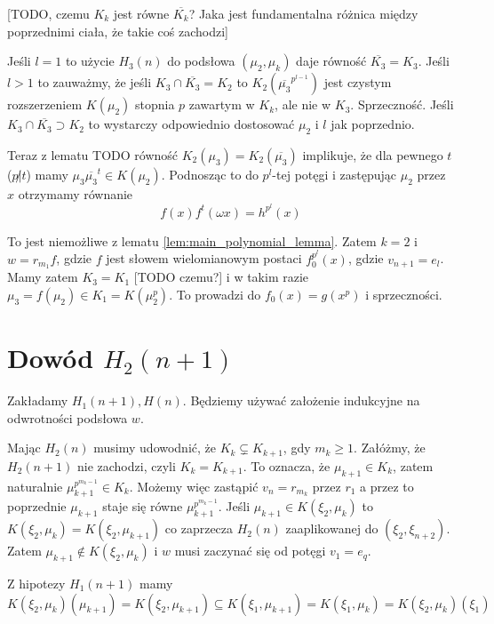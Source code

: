 [TODO, czemu $K_k$ jest równe $\overline{K_k}$? Jaka jest fundamentalna różnica
między poprzednimi ciała, że takie coś zachodzi]

Jeśli $l = 1$ to użycie $H_3(n)$ do podsłowa $\left(\mu_2, \mu_k\right)$ daje
równość $\overline{K_3} = K_3$. Jeśli $l > 1$ to zauważmy, że jeśli $K_3 \cap
\overline{K_3} = K_2$ to $K_2\left(\overline{\mu_3}^{p^{l-1}}\right)$ jest
czystym rozszerzeniem $K\left(\mu_2\right)$ stopnia $p$ zawartym w $K_k$, ale
nie w $K_3$. Sprzeczność. Jeśli $K_3 \cap \overline{K_3} \supset K_2$ to
wystarczy odpowiednio dostosować $\mu_2$ i $l$ jak poprzednio.

Teraz z lematu TODO równość $K_2\left(\mu_3\right) =
K_2\left(\overline{\mu_3}\right)$ implikuje, że dla pewnego $t$ ($p \not | t$)
mamy $\mu_3\overline{\mu_3}^t \in K\left(\mu_2\right)$. Podnosząc to do
$p^l$-tej potęgi i zastępując $\mu_2$ przez $x$ otrzymamy równanie
\[ f(x)f^t(\omega x) = h^{p^l}(x)\]

To jest niemożliwe z lematu \ref{lem:main_polynomial_lemma}. Zatem $k = 2$ i $w
= r_{m_1}f$, gdzie $f$ jest słowem wielomianowym postaci $f_0^{p^l}(x)$, gdzie
$v_{n+1} = e_l$. Mamy zatem $K_3 = K_1$ [TODO czemu?] i  w takim razie $\mu_3 =
f\left(\mu_2\right) \in K_1 = K\left(\mu_2^p\right)$. To prowadzi do $f_0(x) =
g\left(x^p\right)$ i sprzeczności.

\section{Dowód $H_2(n+1)$}
Zakładamy $H_1(n+1), H(n)$. Będziemy używać założenie indukcyjne na odwrotności
podsłowa $w$.

Mając $H_2(n)$ musimy udowodnić, że $K_k \subsetneq K_{k+1}$, gdy $m_k \geq 1$.
Załóżmy, że $H_2(n+1)$ nie zachodzi, czyli $K_k = K_{k+1}$. To oznacza, że
$\mu_{k+1} \in K_k$, zatem naturalnie $\mu_{k+1}^{p^{m_k -1}} \in K_k$. Możemy
więc zastąpić $v_n = r_{m_k}$ przez $r_1$ a przez to poprzednie $\mu_{k+1}$
staje się równe $\mu_{k+1}^{p^{m_k - 1}}$.
Jeśli $\mu_{k+1} \in K\left(\xi_2, \mu_k\right)$ to $K\left(\xi_2, \mu_k\right)
= K\left(\xi_2, \mu_{k+1}\right)$ co zaprzecza $H_2(n)$ zaaplikowanej do
$\left(\xi_2, \xi_{n+2}\right)$. Zatem $\mu_{k+1} \not \in K\left(\xi_2,
\mu_k\right)$ i $w$ musi zaczynać się od potęgi $v_1 = e_q$.

Z hipotezy $H_1(n+1)$ mamy
\[
  K\left(\xi_2, \mu_k\right) \left(\mu_{k+1}\right)
  =
  K\left(\xi_2, \mu_{k+1}\right)
  \subseteq
  K\left(\xi_1, \mu_{k+1}\right)
  =
  K\left(\xi_1, \mu_{k}\right)
  =
  K\left(\xi_2, \mu_{k}\right)\left(\xi_1\right)
\]

